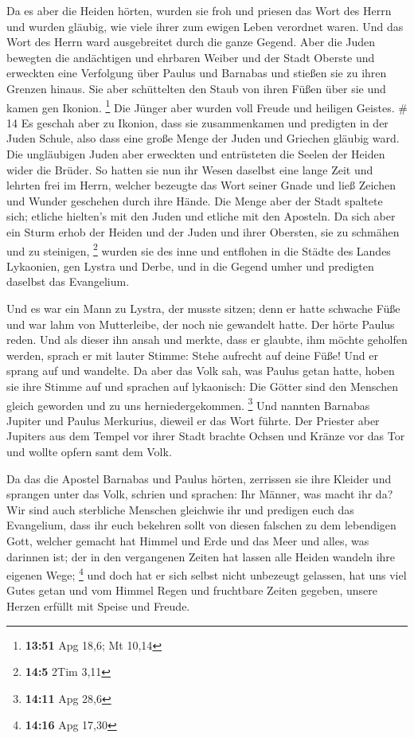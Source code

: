  Da es aber die Heiden hörten, wurden sie froh und priesen
das Wort des Herrn und wurden gläubig, wie viele ihrer zum ewigen Leben
verordnet waren.  Und das Wort des Herrn ward ausgebreitet
durch die ganze Gegend.  Aber die Juden bewegten die
andächtigen und ehrbaren Weiber und der Stadt Oberste und erweckten eine
Verfolgung über Paulus und Barnabas und stießen sie zu ihren Grenzen
hinaus.  Sie aber schüttelten den Staub von ihren Füßen
über sie und kamen gen Ikonion. \footnote{\textbf{13:51} Apg 18,6; Mt
  10,14}  Die Jünger aber wurden voll Freude und heiligen
Geistes. \# 14  Es geschah aber zu Ikonion, dass sie
zusammenkamen und predigten in der Juden Schule, also dass eine große
Menge der Juden und Griechen gläubig ward.  Die ungläubigen
Juden aber erweckten und entrüsteten die Seelen der Heiden wider die
Brüder.  So hatten sie nun ihr Wesen daselbst eine lange
Zeit und lehrten frei im Herrn, welcher bezeugte das Wort seiner Gnade
und ließ Zeichen und Wunder geschehen durch ihre Hände.  Die
Menge aber der Stadt spaltete sich; etliche hielten's mit den Juden und
etliche mit den Aposteln.  Da sich aber ein Sturm erhob der
Heiden und der Juden und ihrer Obersten, sie zu schmähen und zu
steinigen, \footnote{\textbf{14:5} 2Tim 3,11}  wurden sie
des inne und entflohen in die Städte des Landes Lykaonien, gen Lystra
und Derbe, und in die Gegend umher  und predigten daselbst
das Evangelium.

 Und es war ein Mann zu Lystra, der musste sitzen; denn er
hatte schwache Füße und war lahm von Mutterleibe, der noch nie gewandelt
hatte.  Der hörte Paulus reden. Und als dieser ihn ansah und
merkte, dass er glaubte, ihm möchte geholfen werden, 
sprach er mit lauter Stimme: Stehe aufrecht auf deine Füße! Und er
sprang auf und wandelte.  Da aber das Volk sah, was Paulus
getan hatte, hoben sie ihre Stimme auf und sprachen auf lykaonisch: Die
Götter sind den Menschen gleich geworden und zu uns herniedergekommen.
\footnote{\textbf{14:11} Apg 28,6}  Und nannten Barnabas
Jupiter und Paulus Merkurius, dieweil er das Wort führte. 
Der Priester aber Jupiters aus dem Tempel vor ihrer Stadt brachte Ochsen
und Kränze vor das Tor und wollte opfern samt dem Volk.

 Da das die Apostel Barnabas und Paulus hörten, zerrissen
sie ihre Kleider und sprangen unter das Volk, schrien  und
sprachen: Ihr Männer, was macht ihr da? Wir sind auch sterbliche
Menschen gleichwie ihr und predigen euch das Evangelium, dass ihr euch
bekehren sollt von diesen falschen zu dem lebendigen Gott, welcher
gemacht hat Himmel und Erde und das Meer und alles, was darinnen ist;
 der in den vergangenen Zeiten hat lassen alle Heiden
wandeln ihre eigenen Wege; \footnote{\textbf{14:16} Apg 17,30}
 und doch hat er sich selbst nicht unbezeugt gelassen, hat
uns viel Gutes getan und vom Himmel Regen und fruchtbare Zeiten gegeben,
unsere Herzen erfüllt mit Speise und Freude.

